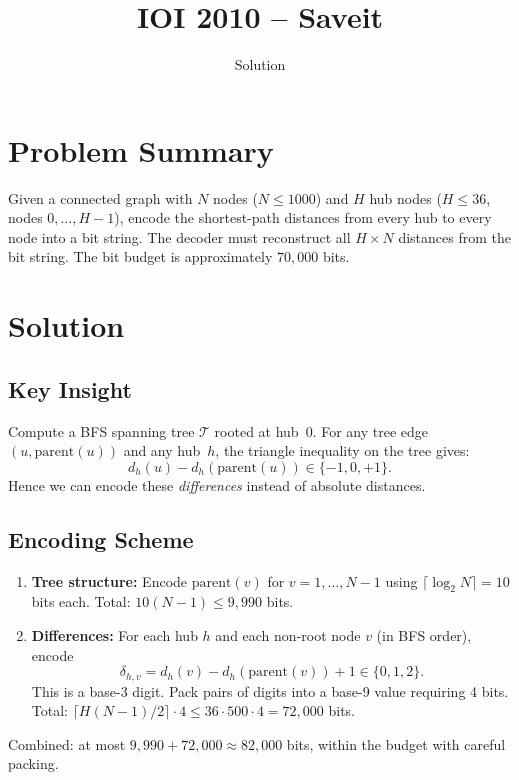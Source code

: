 \documentclass[11pt,a4paper]{article}
\title{IOI 2010 -- Saveit}
\author{Solution}
\date{}
\begin{document}
\maketitle

\section{Problem Summary}
Given a connected graph with $N$ nodes ($N \le 1000$) and $H$ hub nodes ($H \le 36$, nodes $0, \ldots, H-1$), encode the shortest-path distances from every hub to every node into a bit string. The decoder must reconstruct all $H \times N$ distances from the bit string. The bit budget is approximately $70{,}000$ bits.

\section{Solution}

\subsection{Key Insight}
Compute a BFS spanning tree $\mathcal{T}$ rooted at hub~$0$. For any tree edge $(u, \mathrm{parent}(u))$ and any hub~$h$, the triangle inequality on the tree gives:
\[
d_h(u) - d_h(\mathrm{parent}(u)) \in \{-1, 0, +1\}.
\]
Hence we can encode these \emph{differences} instead of absolute distances.

\subsection{Encoding Scheme}
\begin{enumerate}
    \item \textbf{Tree structure:} Encode $\mathrm{parent}(v)$ for $v = 1, \ldots, N-1$ using $\lceil \log_2 N \rceil = 10$ bits each. Total: $10(N-1) \le 9{,}990$ bits.
    \item \textbf{Differences:} For each hub $h$ and each non-root node $v$ (in BFS order), encode
    \[
    \delta_{h,v} = d_h(v) - d_h(\mathrm{parent}(v)) + 1 \in \{0, 1, 2\}.
    \]
    This is a base-3 digit. Pack pairs of digits into a base-9 value requiring 4 bits. Total: $\lceil H(N-1)/2 \rceil \cdot 4 \le 36 \cdot 500 \cdot 4 = 72{,}000$ bits.
\end{enumerate}

Combined: at most $9{,}990 + 72{,}000 \approx 82{,}000$ bits, within the budget with careful packing.
\end{document}
